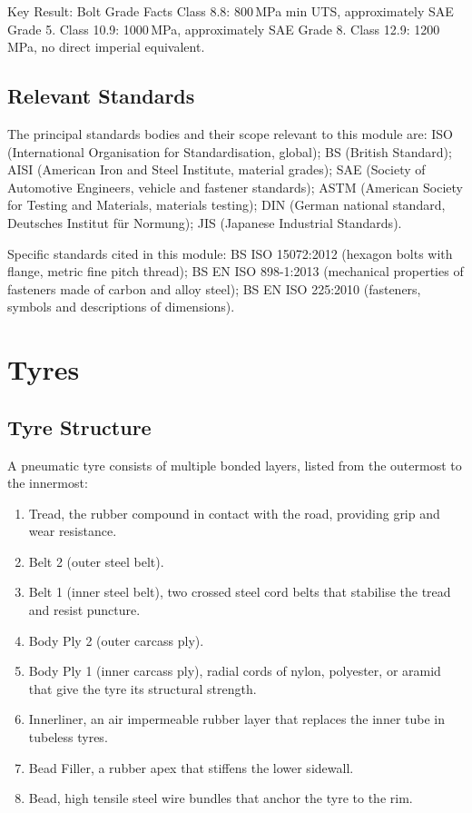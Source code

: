 \documentclass[10pt,a4paper]{article}
\begin{document}
\begin{keybox}{Key Result: Bolt Grade Facts}
Class 8.8: 800\,MPa min UTS, approximately SAE Grade 5. Class 10.9: 1000\,MPa, approximately SAE Grade 8. Class 12.9: 1200\,MPa, no direct imperial equivalent.
\end{keybox}

\subsection{Relevant Standards}

The principal standards bodies and their scope relevant to this module are: ISO (International Organisation for Standardisation, global); BS (British Standard); AISI (American Iron and Steel Institute, material grades); SAE (Society of Automotive Engineers, vehicle and fastener standards); ASTM (American Society for Testing and Materials, materials testing); DIN (German national standard, Deutsches Institut f\"ur Normung); JIS (Japanese Industrial Standards).

Specific standards cited in this module: BS ISO 15072:2012 (hexagon bolts with flange, metric fine pitch thread); BS EN ISO 898-1:2013 (mechanical properties of fasteners made of carbon and alloy steel); BS EN ISO 225:2010 (fasteners, symbols and descriptions of dimensions).

\section{Tyres}

\subsection{Tyre Structure}

A pneumatic tyre consists of multiple bonded layers, listed from the outermost to the innermost:
\begin{enumerate}
\item Tread, the rubber compound in contact with the road, providing grip and wear resistance.
\item Belt 2 (outer steel belt).
\item Belt 1 (inner steel belt), two crossed steel cord belts that stabilise the tread and resist puncture.
\item Body Ply 2 (outer carcass ply).
\item Body Ply 1 (inner carcass ply), radial cords of nylon, polyester, or aramid that give the tyre its structural strength.
\item Innerliner, an air impermeable rubber layer that replaces the inner tube in tubeless tyres.
\item Bead Filler, a rubber apex that stiffens the lower sidewall.
\item Bead, high tensile steel wire bundles that anchor the tyre to the rim.
\end{enumerate}
\end{document}
